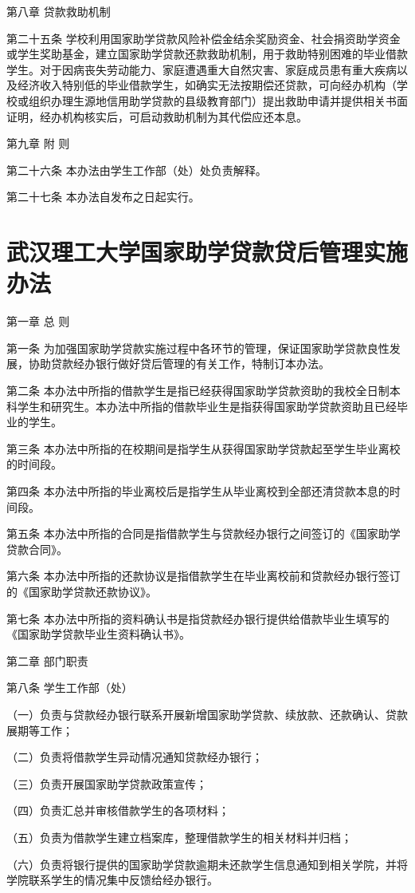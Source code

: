 \documentclass[UTF8,12pt,a4paper]{report}
\begin{document}
第八章 贷款救助机制

第二十五条 学校利用国家助学贷款风险补偿金结余奖励资金、社会捐资助学资金或学生奖助基金，建立国家助学贷款还款救助机制，用于救助特别困难的毕业借款学生。对于因病丧失劳动能力、家庭遭遇重大自然灾害、家庭成员患有重大疾病以及经济收入特别低的毕业借款学生，如确实无法按期偿还贷款，可向经办机构（学校或组织办理生源地信用助学贷款的县级教育部门）提出救助申请并提供相关书面证明，经办机构核实后，可启动救助机制为其代偿应还本息。

第九章 附 则

第二十六条 本办法由学生工作部（处）处负责解释。

第二十七条 本办法自发布之日起实行。
\chapter{武汉理工大学国家助学贷款贷后管理实施办法}
第一章 总 则

第一条 为加强国家助学贷款实施过程中各环节的管理，保证国家助学贷款良性发展，协助贷款经办银行做好贷后管理的有关工作，特制订本办法。

第二条 本办法中所指的借款学生是指已经获得国家助学贷款资助的我校全日制本科学生和研究生。本办法中所指的借款毕业生是指获得国家助学贷款资助且已经毕业的学生。

第三条 本办法中所指的在校期间是指学生从获得国家助学贷款起至学生毕业离校的时间段。

第四条 本办法中所指的毕业离校后是指学生从毕业离校到全部还清贷款本息的时间段。

第五条 本办法中所指的合同是指借款学生与贷款经办银行之间签订的《国家助学贷款合同》。

第六条 本办法中所指的还款协议是指借款学生在毕业离校前和贷款经办银行签订的《国家助学贷款还款协议》。

第七条 本办法中所指的资料确认书是指贷款经办银行提供给借款毕业生填写的《国家助学贷款毕业生资料确认书》。

第二章 部门职责

第八条 学生工作部（处）

（一）负责与贷款经办银行联系开展新增国家助学贷款、续放款、还款确认、贷款展期等工作；

（二）负责将借款学生异动情况通知贷款经办银行；

（三）负责开展国家助学贷款政策宣传；

（四）负责汇总并审核借款学生的各项材料；

（五）负责为借款学生建立档案库，整理借款学生的相关材料并归档；

（六）负责将银行提供的国家助学贷款逾期未还款学生信息通知到相关学院，并将学院联系学生的情况集中反馈给经办银行。
\end{document}
